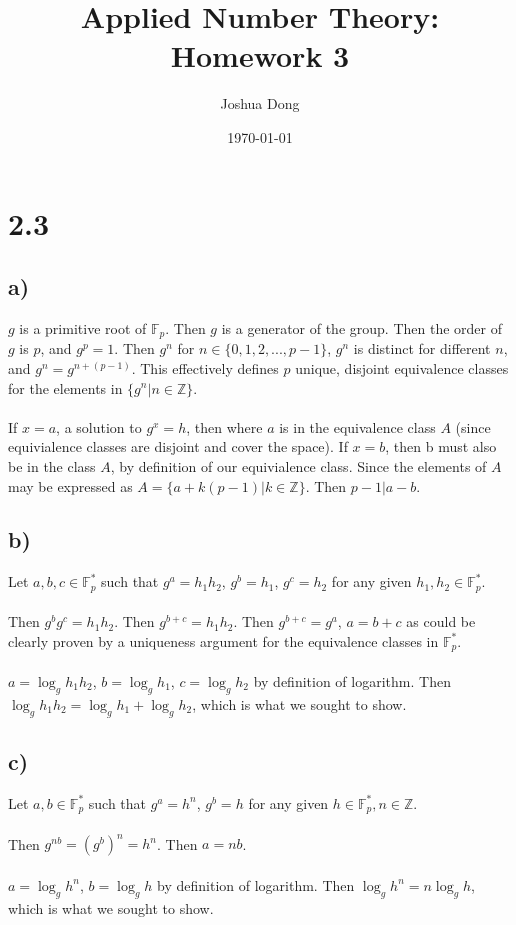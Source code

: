 \documentclass{article}
\begin{document}
\title{Applied Number Theory: Homework 3}
\author{Joshua Dong}
\date{\today}
\maketitle

\section{2.3}
\subsection{a)}
$g$ is a primitive root of $\mathbb{F}_p$.
Then $g$ is a generator of the group.
Then the order of $g$ is $p$, and $g^p = 1$.
Then $g^n$ for $n \in \{0, 1, 2, ..., p-1\}$, $g^n$ is distinct
for different $n$, and $g^n = g^{n + (p-1)}$.
This effectively defines $p$ unique, disjoint equivalence classes
for the elements in $\{g^n | n \in \mathbb{Z} \}$.
\\\\
If $x = a$, a solution to $g^x = h$, then where $a$ is in the equivalence
class $A$ (since equivialence classes are disjoint and cover the space).
If $x = b$, then b must also be in the class $A$, by definition of our
equivialence class.
Since the elements of $A$ may be expressed as $A = \{a + k(p - 1) | k \in \mathbb{Z}\}$.
Then $p - 1 | a - b$.

\subsection{b)}
Let $a,b,c \in \mathbb{F}^*_p$ such that
$g^a = h_1h_2$, $g^b = h_1$, $g^c = h_2$ for any given $h_1, h_2 \in \mathbb{F}^*_p$.
\\\\
Then $g^bg^c = h_1h_2$.
Then $g^{b+c} = h_1h_2$.
Then $g^{b+c} = g^a$, $a = b+c$ as could be clearly proven by a
uniqueness argument for the equivalence classes in $\mathbb{F}^*_p$.
\\\\
$a = \log_g h_1h_2$, $b = \log_g h_1$, $c = \log_g h_2$ by definition of logarithm.
Then $\log_g h_1h_2 = \log_g h_1 + \log_g h_2$, which is what we sought to show.

\subsection{c)}
Let $a,b \in \mathbb{F}^*_p$ such that
$g^a = h^n$, $g^b = h$ for any given $h \in \mathbb{F}^*_p, n \in \mathbb{Z}$.
\\\\
Then $g^{nb} = (g^{b})^n = h^n$. Then $a = nb$.
\\\\
$a = \log_g h^n$, $b = \log_g h$ by definition of logarithm.
Then $\log_g h^n = n\log_g h$, which is what we sought to show.
\end{document}
